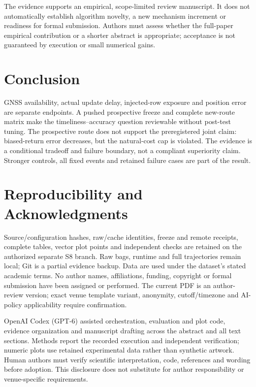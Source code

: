 \documentclass[conference]{IEEEtran}
\begin{document}
The evidence supports an empirical, scope-limited review manuscript. It does not automatically establish algorithm novelty, a new mechanism increment or readiness for formal submission. Authors must assess whether the full-paper empirical contribution or a shorter abstract is appropriate; acceptance is not guaranteed by execution or small numerical gains.

\section{Conclusion}
GNSS availability, actual update delay, injected-row exposure and position error are separate endpoints. A pushed prospective freeze and complete new-route matrix make the timeliness--accuracy question reviewable without post-test tuning. The prospective route does not support the preregistered joint claim: biased-return error decreases, but the natural-cost cap is violated. The evidence is a conditional tradeoff and failure boundary, not a compliant superiority claim. Stronger controls, all fixed events and retained failure cases are part of the result.

\section*{Reproducibility and Acknowledgments}
Source/configuration hashes, raw/cache identities, freeze and remote receipts, complete tables, vector plot points and independent checks are retained on the authorized separate S8 branch. Raw bags, runtime and full trajectories remain local; Git is a partial evidence backup. Data are used under the dataset's stated academic terms. No author names, affiliations, funding, copyright or formal submission have been assigned or performed. The current PDF is an author-review version; exact venue template variant, anonymity, cutoff/timezone and AI-policy applicability require confirmation.

OpenAI Codex (GPT-6) assisted orchestration, evaluation and plot code, evidence organization and manuscript drafting across the abstract and all text sections. Methods report the recorded execution and independent verification; numeric plots use retained experimental data rather than synthetic artwork. Human authors must verify scientific interpretation, code, references and wording before adoption. This disclosure does not substitute for author responsibility or venue-specific requirements.

\end{document}
